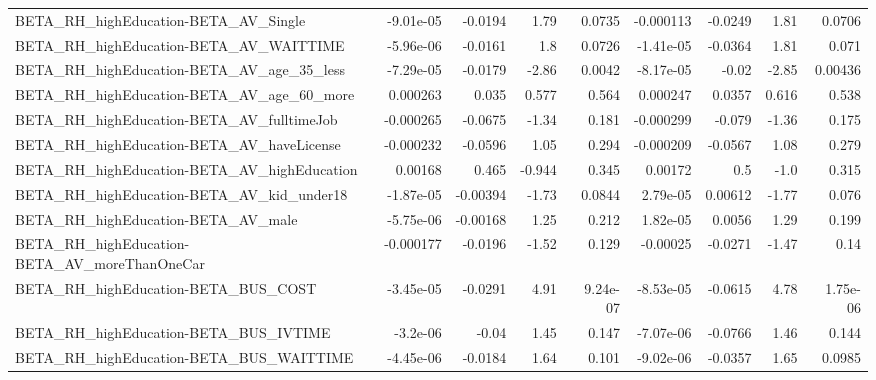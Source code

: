 \begin{tabular}{lrrrrrrrr}
BETA\_RH\_highEducation-BETA\_AV\_Single               &   -9.01e-05 &      -0.0194 &      1.79 &   0.0735 &  -0.000113 &     -0.0249 &         1.81 &        0.0706 \\
BETA\_RH\_highEducation-BETA\_AV\_WAITTIME             &   -5.96e-06 &      -0.0161 &       1.8 &   0.0726 &  -1.41e-05 &     -0.0364 &         1.81 &         0.071 \\
BETA\_RH\_highEducation-BETA\_AV\_age\_35\_less          &   -7.29e-05 &      -0.0179 &     -2.86 &   0.0042 &  -8.17e-05 &       -0.02 &        -2.85 &       0.00436 \\
BETA\_RH\_highEducation-BETA\_AV\_age\_60\_more          &    0.000263 &        0.035 &     0.577 &    0.564 &   0.000247 &      0.0357 &        0.616 &         0.538 \\
BETA\_RH\_highEducation-BETA\_AV\_fulltimeJob          &   -0.000265 &      -0.0675 &     -1.34 &    0.181 &  -0.000299 &      -0.079 &        -1.36 &         0.175 \\
BETA\_RH\_highEducation-BETA\_AV\_haveLicense          &   -0.000232 &      -0.0596 &      1.05 &    0.294 &  -0.000209 &     -0.0567 &         1.08 &         0.279 \\
BETA\_RH\_highEducation-BETA\_AV\_highEducation        &     0.00168 &        0.465 &    -0.944 &    0.345 &    0.00172 &         0.5 &         -1.0 &         0.315 \\
BETA\_RH\_highEducation-BETA\_AV\_kid\_under18          &   -1.87e-05 &     -0.00394 &     -1.73 &   0.0844 &   2.79e-05 &     0.00612 &        -1.77 &         0.076 \\
BETA\_RH\_highEducation-BETA\_AV\_male                 &   -5.75e-06 &     -0.00168 &      1.25 &    0.212 &   1.82e-05 &      0.0056 &         1.29 &         0.199 \\
BETA\_RH\_highEducation-BETA\_AV\_moreThanOneCar       &   -0.000177 &      -0.0196 &     -1.52 &    0.129 &   -0.00025 &     -0.0271 &        -1.47 &          0.14 \\
BETA\_RH\_highEducation-BETA\_BUS\_COST                &   -3.45e-05 &      -0.0291 &      4.91 & 9.24e-07 &  -8.53e-05 &     -0.0615 &         4.78 &      1.75e-06 \\
BETA\_RH\_highEducation-BETA\_BUS\_IVTIME              &    -3.2e-06 &        -0.04 &      1.45 &    0.147 &  -7.07e-06 &     -0.0766 &         1.46 &         0.144 \\
BETA\_RH\_highEducation-BETA\_BUS\_WAITTIME            &   -4.45e-06 &      -0.0184 &      1.64 &    0.101 &  -9.02e-06 &     -0.0357 &         1.65 &        0.0985 \\

\end{tabular}
